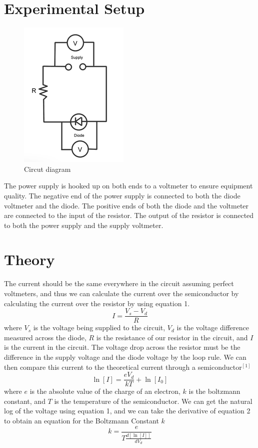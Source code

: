 \documentclass[12pt, a4paper]{article}
\begin{document}
\section{Experimental Setup}
	\begin{figure}[H] \centering
		\includegraphics{assets/circdiag.png}
		\caption{Circut diagram}
	\end{figure}
	The power supply is hooked up on both ends to a voltmeter to ensure equipment quality. The negative end of the power supply is connected to both the diode voltmeter and the diode. The positive ends of both the diode and the voltmeter are connected to the input of the resistor. The output of the resistor is connected to both the power supply and the supply voltmeter.

\section{Theory}
	The current should be the same everywhere in the circuit assuming perfect voltmeters, and thus we can calculate the current over the semiconductor by calculating the current over the resistor by using equation 1.
	\begin{equation}
		I = \frac{V_s - V_d}{R}
		\label{eq. 1}
	\end{equation}
	where $V_s$ is the voltage being supplied to the circuit, $V_d$ is the voltage difference measured across the diode, $R$ is the resistance of our resistor in the circuit, and $I$ is the current in the circuit. The voltage drop across the resistor must be the difference in the supply voltage and the diode voltage by the loop rule. We can then compare this current to the theoretical current through a semiconductor$^{[1]}$
	\begin{equation}
		\ln [I] = \frac{e V_d}{kT} + \ln [I_0]
		\label{eq. 2}
	\end{equation}
	where $e$ is the absolute value of the charge of an electron, $k$ is the boltzmann constant, and $T$ is the temperature of the semiconductor. We can get the natural log of the voltage using equation 1, and we can take the derivative of equation 2 to obtain an equation for the Boltzmann Constant $k$
	\begin{equation}
		k = \frac{e}{T\frac{d[\ln [I]]}{dV_d}}
		\label{eq. 3}
	\end{equation}
\end{document}
